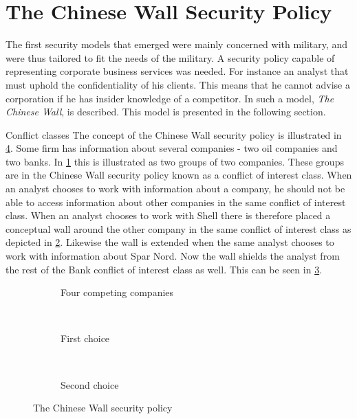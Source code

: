 \section{The Chinese Wall Security Policy}
The first security models that emerged were mainly concerned with military, and were thus tailored to fit the needs of the military.
A security policy capable of representing corporate business services was needed.
For instance an analyst that must uphold the confidentiality of his clients.
This means that he cannot advise a corporation if he has insider knowledge of a competitor.
In \citet{brewer1989chinese} such a model, \emph{The Chinese Wall}, is described.
This model is presented in the following section.

\begin{example}{Conflict classes}
The concept of the Chinese Wall security policy is illustrated in \cref{chinese:illu}.
Some firm has information about several companies - two oil companies and two banks.
In \cref{chinese:illu:situation} this is illustrated as two groups of two companies.
These groups are in the Chinese Wall security policy known as a conflict of interest class.
When an analyst chooses to work with information about a company, he should not be able to access information about other companies in the same conflict of interest class.
When an analyst chooses to work with Shell there is therefore placed a conceptual wall around the other company in the same conflict of interest class as depicted in \cref{chinese:illu:choice1}.
Likewise the wall is extended when the same analyst chooses to work with information about Spar Nord.
Now the wall shields the analyst from the rest of the Bank conflict of interest class as well.
This can be seen in \cref{chinese:illu:choice2}.
\end{example}

\begin{figure}
\centering
    \begin{subfigure}[t]{0.3\textwidth}
        \resizebox{\linewidth}{!}{}
        \caption{Four competing companies}
        \label{chinese:illu:situation}
    \end{subfigure}
    ~
    \begin{subfigure}[t]{0.3\textwidth}
        \resizebox{\linewidth}{!}{}
        \caption{First choice}
        \label{chinese:illu:choice1}
    \end{subfigure}
    ~
    \begin{subfigure}[t]{0.3\textwidth}
        \resizebox{\linewidth}{!}{}
        \caption{Second choice}
        \label{chinese:illu:choice2}
    \end{subfigure}
    \caption{The Chinese Wall security policy}\label{chinese:illu}
\end{figure}


